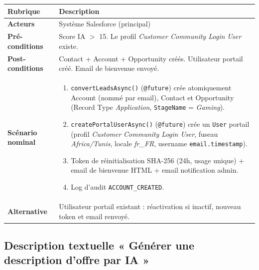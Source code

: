 \begin{longtable}{|p{4cm}|p{10.5cm}|}
\hline
\rowcolor{gray!15} \textbf{Rubrique} & \textbf{Description} \\
\hline
\endfirsthead
\endhead

\textbf{Acteurs} & Système Salesforce (principal) \\
\hline
\textbf{Pré-conditions} & Score IA $>$ 15. Le profil \textit{Customer Community Login User} existe. \\
\hline
\textbf{Post-conditions} & Contact + Account + Opportunity créés. Utilisateur portail créé. Email de bienvenue envoyé. \\
\hline
\textbf{Scénario nominal} &
\begin{enumerate}[nosep,leftmargin=*]
    \item \texttt{convertLeadsAsync()} (\texttt{@future}) crée atomiquement Account (nommé par email), Contact et Opportunity (Record Type \textit{Application}, \texttt{StageName} = \textit{Gaming}).
    \item \texttt{createPortalUserAsync()} (\texttt{@future}) crée un \texttt{User} portail (profil \textit{Customer Community Login User}, fuseau \textit{Africa/Tunis}, locale \textit{fr\_FR}, username \texttt{email.timestamp}).
    \item Token de réinitialisation SHA-256 (24h, usage unique) + email de bienvenue HTML + email notification admin.
    \item Log d'audit \texttt{ACCOUNT\_CREATED}.
\end{enumerate} \\
\hline
\textbf{Alternative} & Utilisateur portail existant : réactivation si inactif, nouveau token et email renvoyé. \\
\hline
\end{longtable}
\FloatBarrier

\subsection{Description textuelle « Générer une description d'offre par IA »}


